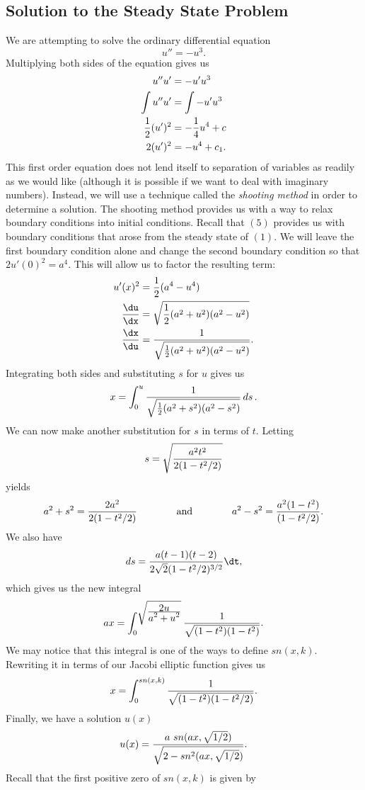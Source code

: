 \documentclass{hw}
\begin{document}
\subsection{Solution to the Steady State Problem}
We are attempting to solve the ordinary differential equation
\[
u''=-u^{3}.
\]
Multiplying both sides of the equation gives us
\begin{align*}
u''u'&=-u'u^{3}\\
\int u''u'&=\int -u'u^{3}\\
{1\over2}(u')^{2}&= -{1\over4}u^{4}+c\\
2(u')^{2}&=-u^{4}+c_{1}.
\end{align*}
This first order equation does not lend itself to separation of variables as readily as we would like
(although it is possible if we want to deal with imaginary numbers). Instead, we will use a technique
called the \textit{shooting method} in order to determine a solution. The shooting method provides
us with a way to relax boundary conditions into initial conditions. Recall that $(5)$ provides us
with boundary conditions that arose from the steady state of $(1)$. We will leave the first boundary
condition alone and change the second boundary condition so that $2u'(0)^{2}=a^{4}$. This will allow
us to factor the resulting term:
\begin{align*}
u'(x)^2&={1\over2}(a^{4}-u^{4})\\
{\du\over\dx}&= \sqrt{{1\over2}(a^{2}+u^{2})(a^{2}-u^{2})}\\
{\dx\over\du}&= {1\over\sqrt{{1\over2}(a^{2}+u^{2})(a^{2}-u^{2})}}.
\end{align*}
Integrating both sides and substituting $s$ for $u$ gives us
\[x=\int_{0}^{u}{1\over\sqrt{{1\over2}(a^{2}+s^{2})(a^{2}-s^{2})}}\mathop{ds}.\]
We can now make another substitution for $s$ in terms of $t$. Letting
\[
s=\sqrt{{a^2t^2\over2(1-t^2/2)}}
\]
yields
\[
a^2+s^2={2a^2\over2(1-t^2/2)}\qquad\qquad\text{and}\qquad\qquad
a^2-s^2={a^2(1-t^2)\over(1-t^2/2)}.
\]
We also have
\[
\mathop{ds}={a(t-1)(t-2)\over2\sqrt{2}(1-t^2/2)^{3/2}}\dt,
\]
which gives us the new integral
\[
ax=\int_{0}^{\sqrt{\frac{\displaystyle2u}{\displaystyle a^2+u^2}}}{1\over\sqrt{(1-t^2)(1-t^2)}}.
\]
We may notice that this integral is one of the ways to define $sn(x,k)$. Rewriting it in terms
of our Jacobi elliptic function gives us
\[
x=\int_{0}^{sn(x,k)}{1\over\sqrt{(1-t^2)(1-t^2/2)}}.
\]
Finally, we have a solution $u(x)$
\[
u(x)={a\ sn(ax,\sqrt{1/2})\over\sqrt{2-sn^{2}(ax,\sqrt{1/2})}}.
\]
Recall that the first positive zero of $sn(x,k)$ is given by
\end{document}
